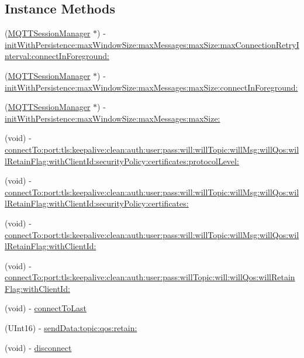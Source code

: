 \subsection*{Instance Methods}
\begin{DoxyCompactItemize}
\item 
(\hyperlink{interface_m_q_t_t_session_manager}{M\+Q\+T\+T\+Session\+Manager} $\ast$) -\/ \hyperlink{interface_m_q_t_t_session_manager_a40c9ac2c9110a250caf35b16ff03f008}{init\+With\+Persistence\+:max\+Window\+Size\+:max\+Messages\+:max\+Size\+:max\+Connection\+Retry\+Interval\+:connect\+In\+Foreground\+:}
\item 
(\hyperlink{interface_m_q_t_t_session_manager}{M\+Q\+T\+T\+Session\+Manager} $\ast$) -\/ \hyperlink{interface_m_q_t_t_session_manager_acae1db469b891501860bc1fbcfb5d7d7}{init\+With\+Persistence\+:max\+Window\+Size\+:max\+Messages\+:max\+Size\+:connect\+In\+Foreground\+:}
\item 
(\hyperlink{interface_m_q_t_t_session_manager}{M\+Q\+T\+T\+Session\+Manager} $\ast$) -\/ \hyperlink{interface_m_q_t_t_session_manager_ae57cebdca6694242b821cf089fea458d}{init\+With\+Persistence\+:max\+Window\+Size\+:max\+Messages\+:max\+Size\+:}
\item 
(void) -\/ \hyperlink{interface_m_q_t_t_session_manager_a81d38d54b7a1e1feea69ac4e80a7ff51}{connect\+To\+:port\+:tls\+:keepalive\+:clean\+:auth\+:user\+:pass\+:will\+:will\+Topic\+:will\+Msg\+:will\+Qos\+:will\+Retain\+Flag\+:with\+Client\+Id\+:security\+Policy\+:certificates\+:protocol\+Level\+:}
\item 
(void) -\/ \hyperlink{interface_m_q_t_t_session_manager_af3e7b52cf514bd47d5ec140dba16abf5}{connect\+To\+:port\+:tls\+:keepalive\+:clean\+:auth\+:user\+:pass\+:will\+:will\+Topic\+:will\+Msg\+:will\+Qos\+:will\+Retain\+Flag\+:with\+Client\+Id\+:security\+Policy\+:certificates\+:}
\item 
(void) -\/ \hyperlink{interface_m_q_t_t_session_manager_a1c0903acd31887dfa1e1d16039aa53ec}{connect\+To\+:port\+:tls\+:keepalive\+:clean\+:auth\+:user\+:pass\+:will\+:will\+Topic\+:will\+Msg\+:will\+Qos\+:will\+Retain\+Flag\+:with\+Client\+Id\+:}
\item 
(void) -\/ \hyperlink{interface_m_q_t_t_session_manager_a4ebc8a89857aeae6377861c8fea310d2}{connect\+To\+:port\+:tls\+:keepalive\+:clean\+:auth\+:user\+:pass\+:will\+Topic\+:will\+:will\+Qos\+:will\+Retain\+Flag\+:with\+Client\+Id\+:}
\item 
(void) -\/ \hyperlink{interface_m_q_t_t_session_manager_a6bd1e45c0504df0b0d2599f86f84f884}{connect\+To\+Last}
\item 
(U\+Int16) -\/ \hyperlink{interface_m_q_t_t_session_manager_a7755c32b246dcefc8ad6d50a51f2e616}{send\+Data\+:topic\+:qos\+:retain\+:}
\item 
(void) -\/ \hyperlink{interface_m_q_t_t_session_manager_a71161804d040ca10e164578d7e7eb855}{disconnect}
\end{DoxyCompactItemize}
